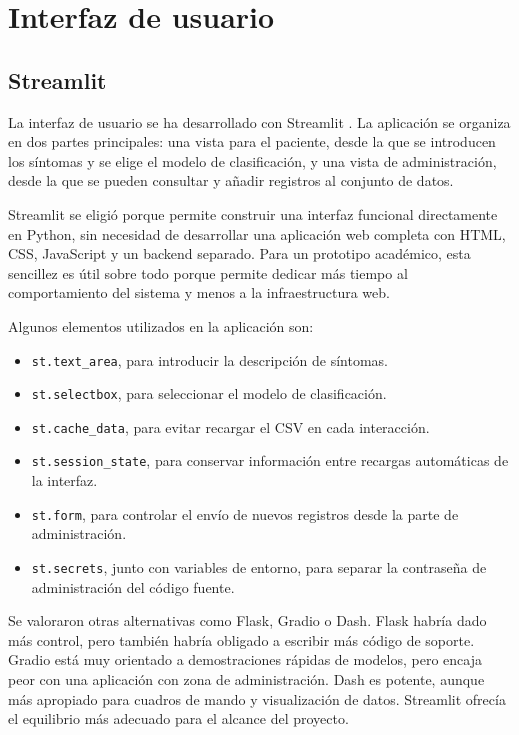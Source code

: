 \section{Interfaz de usuario}

\subsection{Streamlit}

La interfaz de usuario se ha desarrollado con Streamlit \cite{streamlit_official}. La aplicación se organiza en dos partes principales: una vista para el paciente, desde la que se introducen los síntomas y se elige el modelo de clasificación, y una vista de administración, desde la que se pueden consultar y añadir registros al conjunto de datos.

Streamlit se eligió porque permite construir una interfaz funcional directamente en Python, sin necesidad de desarrollar una aplicación web completa con HTML, CSS, JavaScript y un backend separado. Para un prototipo académico, esta sencillez es útil sobre todo porque permite dedicar más tiempo al comportamiento del sistema y menos a la infraestructura web.

Algunos elementos utilizados en la aplicación son:

\begin{itemize}
	\item \texttt{st.text\_area}, para introducir la descripción de síntomas.
	
	\item \texttt{st.selectbox}, para seleccionar el modelo de clasificación.
	
	\item \texttt{st.cache\_data}, para evitar recargar el CSV en cada interacción.
	
	\item \texttt{st.session\_state}, para conservar información entre recargas automáticas de la interfaz.
	
	\item \texttt{st.form}, para controlar el envío de nuevos registros desde la parte de administración.
	
	\item \texttt{st.secrets}, junto con variables de entorno, para separar la contraseña de administración del código fuente.
\end{itemize}

Se valoraron otras alternativas como Flask, Gradio o Dash. Flask habría dado más control, pero también habría obligado a escribir más código de soporte. Gradio está muy orientado a demostraciones rápidas de modelos, pero encaja peor con una aplicación con zona de administración. Dash es potente, aunque más apropiado para cuadros de mando y visualización de datos. Streamlit ofrecía el equilibrio más adecuado para el alcance del proyecto.

